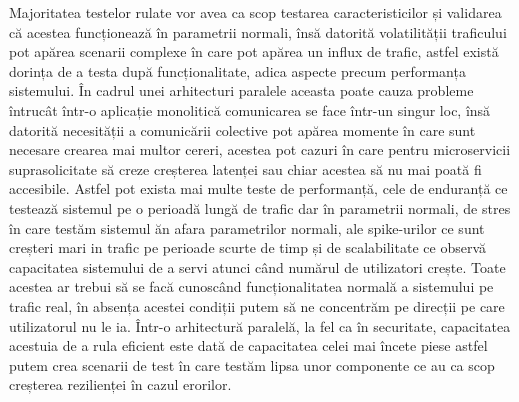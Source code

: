 Majoritatea testelor rulate vor avea ca scop testarea caracteristicilor și validarea
că acestea funcționează în parametrii normali, însă datorită volatilității traficului
pot apărea scenarii complexe în care pot apărea un influx de trafic, astfel există 
dorința de a testa după funcționalitate, adica aspecte precum performanța sistemului.
În cadrul unei arhitecturi paralele aceasta poate cauza probleme întrucât într-o aplicație
monolitică comunicarea se face într-un singur loc, însă datorită necesității a comunicării 
colective pot apărea momente în care sunt necesare crearea mai multor cereri, acestea pot
cazuri în care pentru microservicii suprasolicitate să creze creșterea latenței sau
chiar acestea să nu mai poată fi accesibile. Astfel pot exista mai multe teste de performanță,
cele de enduranță ce testează sistemul pe o perioadă lungă de trafic dar în parametrii normali,
de stres în care testăm sistemul ăn afara parametrilor normali, ale spike-urilor ce sunt creșteri
mari in trafic pe perioade scurte de timp și de scalabilitate ce observă capacitatea 
sistemului de a servi atunci când numărul de utilizatori crește. Toate acestea ar trebui să 
se facă cunoscând funcționalitatea normală a sistemului pe trafic real, în absența acestei condiții
putem să ne concentrăm pe direcții pe care utilizatorul nu le ia. Într-o arhitectură paralelă,
la fel ca în securitate, capacitatea acestuia de a rula eficient este dată de capacitatea celei
mai încete piese astfel putem crea scenarii de test în care testăm lipsa unor componente ce
au ca scop creșterea rezilienței în cazul erorilor.

